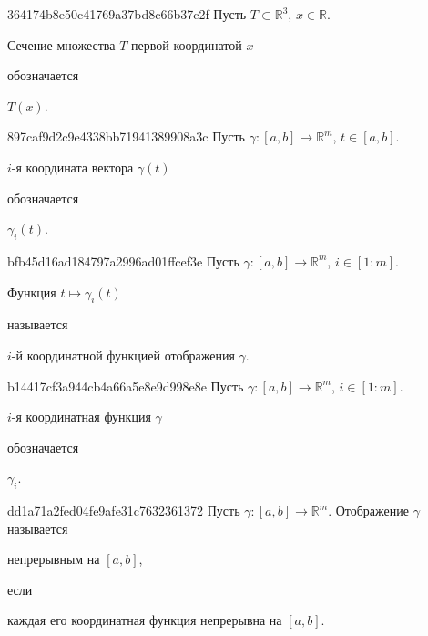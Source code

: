 \begin{note}{364174b8e50c41769a37bd8c66b37c2f}
    Пусть \({ T \subset \mathbb R^3 }\), \({ x \in \mathbb R }\).
    \begin{icloze}{2}Сечение множества \({ T }\) первой  координатой \({ x }\)\end{icloze} обозначается \begin{icloze}{1}\({ T(x) }\).\end{icloze}
\end{note}

\begin{note}{897caf9d2c9e4338bb71941389908a3c}
    Пусть \({ \gamma : [a, b] \to \mathbb R^{m} }\), \({ t \in [a, b] }\).
    \begin{icloze}{2}\({ i }\)-я координата вектора \({ \gamma(t) }\)\end{icloze} обозначается \begin{icloze}{1}\({ \gamma_i(t) }\).\end{icloze}
\end{note}

\begin{note}{bfb45d16ad184797a2996ad01ffcef3e}
    Пусть \({ \gamma : [a, b] \to \mathbb R^{m} }\), \({ i \in [1 : m] }\).
    \begin{icloze}{2}Функция \({ t \mapsto \gamma_i(t) }\)\end{icloze} называется \begin{icloze}{1}\({ i }\)-й координатной функцией отображения \({ \gamma }\).\end{icloze}
\end{note}

\begin{note}{b14417cf3a944cb4a66a5e8e9d998e8e}
    Пусть \({ \gamma : [a, b] \to \mathbb R^{m} }\), \({ i \in [1 : m] }\).
    \begin{icloze}{2}\({ i }\)-я координатная функция \({ \gamma }\)\end{icloze} обозначается \begin{icloze}{1}\({ \gamma_i }\).\end{icloze}
\end{note}

\begin{note}{dd1a71a2fed04fe9afe31c7632361372}
    Пусть \({ \gamma : [a, b] \to \mathbb R^{m} }\).
    Отображение \({ \gamma }\) называется \begin{icloze}{2}непрерывным на \({ [a, b] }\),\end{icloze} если \begin{icloze}{1}каждая его координатная функция непрерывна на \({ [a, b] }\).\end{icloze}
\end{note}

